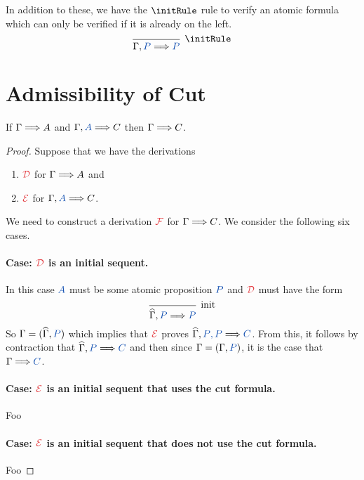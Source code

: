 In addition to these, we have the $\initRule$ rule to verify an atomic formula
which can only be verified if it is already on the left.
\[
  \begin{prooftree}
    \infer0[$\initRule$]{\sequent[\prp{P}]{\prp{P}}}
  \end{prooftree}
\]

\section{Admissibility of Cut}

\begin{theorem}[Cut]
  If $\sequent{A}$ and $\sequent[A]{C}$ then $\sequent{C}$.
\end{theorem}
\begin{proof}
  Suppose that we have the derivations
  \begin{enumerate}
    \item $\prf{D}$ for $\sequent{A}$ and
    \item $\prf{E}$ for $\sequent[A]{C}$.
  \end{enumerate}
  We need to construct a derivation $\prf{F}$ for $\sequent{}{C}$.
  We consider the following six cases.

  \paragraph{Case: $\prf{D}$ is an initial sequent.} In this case
  $\prp{A}$ must be some atomic proposition $\prp{P}$ and $\prf{D}$
  must have the form
  \[
      \begin{prooftree}
        \infer0[init]{\sequentHat[P]{P}}
      \end{prooftree}
  \]
  So $\Gamma = (\widehat{\Gamma}, \prp{P})$ which implies that $\prf{E}$ proves
  $\sequentHat[\prp{P}, \prp{P}]{C}$. From this, it follows by contraction
  that $\sequentHat[\prp{P}]{C}$ and then since $\Gamma = (\Gamma, \prp{P})$,
  it is the case that $\sequent{\prp{C}}$.

  \paragraph{Case: $\prf{E}$ is an initial sequent that uses the cut formula.}
  Foo

  \paragraph{Case: $\prf{E}$ is an initial sequent that does not use the cut
  formula.} Foo


\end{proof}




